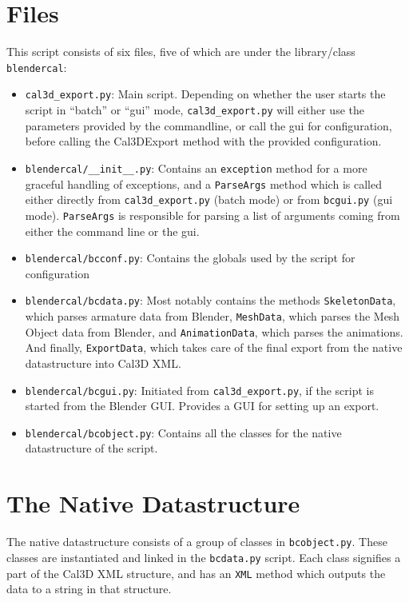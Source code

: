 

\section*{Files}
This script consists of six files, five of which are under the library/class \texttt{blendercal}:
\begin{itemize}
\item \texttt{cal3d\_export.py}: Main script. Depending on whether the user starts the script in ``batch'' or ``gui'' mode, \texttt{cal3d\_export.py} will either use the parameters provided by the commandline, or call the gui for configuration, before calling the Cal3DExport method with the provided configuration.
\item \texttt{blendercal/\_\_init\_\_.py}: Contains an \texttt{exception} method for a more graceful handling of exceptions, and a \texttt{ParseArgs} method which is called either directly from \texttt{cal3d\_export.py} (batch mode) or from \texttt{bcgui.py} (gui mode). \texttt{ParseArgs} is responsible for parsing a list of arguments coming from either the command line or the gui.
\item \texttt{blendercal/bcconf.py}: Contains the globals used by the script for configuration
\item \texttt{blendercal/bcdata.py}: Most notably contains the methods \texttt{SkeletonData}, which parses armature data from Blender, \texttt{MeshData}, which parses the Mesh Object data from Blender, and \texttt{AnimationData}, which parses the animations. And finally, \texttt{ExportData}, which takes care of the final export from the native datastructure into Cal3D XML.
\item \texttt{blendercal/bcgui.py}: Initiated from \texttt{cal3d\_export.py}, if the script is started from the Blender GUI. Provides a GUI for setting up an export.
\item \texttt{blendercal/bcobject.py}: Contains all the classes for the native datastructure of the script.
\end{itemize}

\section*{The Native Datastructure}
The native datastructure consists of a group of classes in \texttt{bcobject.py}. These classes are instantiated and linked in the \texttt{bcdata.py} script. Each class signifies a part of the Cal3D XML structure, and has an \texttt{XML} method which outputs the data to a string in that structure.


